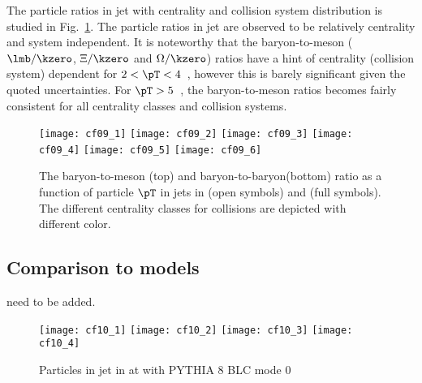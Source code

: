 The particle ratios in jet with centrality and collision system distribution is studied in Fig.~\ref{fig:pppPbRatio}. The particle ratios in jet are observed to be relatively centrality and system independent. It is noteworthy that the baryon-to-meson ($\lmb/\kzero$, $\Xi/\kzero$ and $\Omega/\kzero$) ratios have a hint of centrality (collision system) dependent for $2 < \pT < 4$~\GeVc, however this is barely significant given the quoted uncertainties. For $\pT > 5$~\GeVc, the baryon-to-meson ratios becomes fairly consistent for all centrality classes and collision systems. 
\begin{figure}[!ht]
	\begin{center}
		\texttt{[image: cf09\_1]}
		\texttt{[image: cf09\_2]}
		\texttt{[image: cf09\_3]}
		\texttt{[image: cf09\_4]}
		\texttt{[image: cf09\_5]}
		\texttt{[image: cf09\_6]}
	\end{center}
	\caption{The baryon-to-meson (top) and baryon-to-baryon(bottom) ratio as a function of particle $\pT$ in jets in \pp (open symbols) and \pPb (full symbols). The different centrality classes for \pPb collisions are depicted with different color.}
	\label{fig:pppPbRatio}
\end{figure}

\subsection{Comparison to models}
\label{subsec:ComToMod}

need to be added.

\begin{figure}[!ht]
	\begin{center}
		\texttt{[image: cf10\_1]}
		\texttt{[image: cf10\_2]}
		\texttt{[image: cf10\_3]}
		\texttt{[image: cf10\_4]}

	\end{center}
	\caption{Particles in jet in \pPb at \fivenn with PYTHIA 8 BLC mode 0}
	\label{fig:pPbpyJESpect}
\end{figure}

